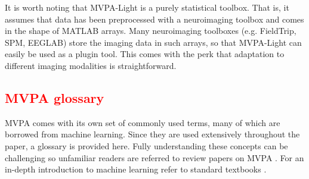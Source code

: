\documentclass[utf8]{frontiersSCNS} %
\newcommand{\red}[1]{\textcolor{red}{#1}}
\begin{document}
It is worth noting that MVPA-Light is a purely statistical toolbox. That is, it assumes that data has been preprocessed with a neuroimaging toolbox and comes in the shape of MATLAB arrays. Many neuroimaging toolboxes (e.g. FieldTrip, SPM, EEGLAB) store the imaging  data in such arrays, so that MVPA-Light can easily be used as a plugin tool. This comes with the perk that adaptation to different imaging modalities is straightforward.

\subsection{\red{MVPA glossary}}

MVPA comes with its own set of commonly used terms, many of which are borrowed from machine learning. Since they are used extensively throughout the paper, a glossary is provided here. Fully understanding these concepts can be challenging so unfamiliar readers are referred to review papers on MVPA  \citep{Mur2009,Misaki2010ComparisonFMRI,Grootswagers2017DecodingData,Pereira2009,Varoquaux2017}. For an in-depth introduction to machine learning refer to standard textbooks \citep{James2013,Hastie2009,Bishop2007}.
\end{document}

